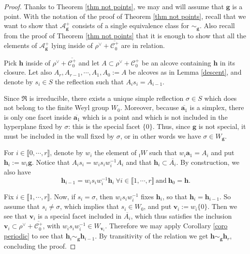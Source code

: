 \documentclass[11pt]{amsart}
\theoremstyle{plain}
\theoremstyle{remark}
\numberwithin{equation}{section}
\begin{document}
	\begin{proof}
		Thanks to Theorem \ref{thm not points}, we may and will assume that $\mathbf{g}$ is a point. With the notation of the proof of Theorem \ref{thm not points}, recall that we want to show that $\mathcal{A}^+_\mathbf{g}$ consists of a single equivalence class for $\sim_{\mathbf{g}}$. Also recall from the proof of Theorem \ref{thm not points} that it is enough to show that all the elements of $\mathcal{A}^+_\mathbf{g}$ lying inside of $\rho^\vee+ \overline{\mathscr{C}^+_0}$ are in relation.
		
		Pick $\mathbf{h}$ inside of $\rho^\vee+\overline{\mathscr{C}^+_0}$ and let $A\subset \rho^\vee+\mathscr{C}^+_0$ be an alcove containing $\mathbf{h}$ in its closure. Let also $A_r,A_{r-1},\cdots,A_1,A_0:=A$ be alcoves as in Lemma \ref{descent}, and denote by $s_i\in S$ the reflection such that $A_is_i=A_{i-1}$. 
		
		Since $\mathfrak{R}$ is irreducible, there exists a unique simple reflection $\sigma\in S$ which does not belong to the finite Weyl group $W_0$. Moreover, because $\overline{\mathbf{a}_1}$ is a simplex, there is only one facet inside $\overline{\mathbf{a}_1}$ which is a point and which is not included in the hyperplane fixed by $\sigma$: this is the special facet $\{0\}$. Thus, since $\mathbf{g}$ is not special, it must be included in the wall fixed by $\sigma$, or in other words we have $\sigma\in W_\mathbf{g}$. 
		
		For $i\in\llbracket 0,\cdots,r\rrbracket$, denote by $w_i$ the element of $_{\mathrm{f}}W$ such that $w_i\mathbf{a}_1=A_i$ and put $\mathbf{h}_i:=w_i\mathbf{g}$. Notice that $A_is_i=w_is_iw_i^{-1}A_i$ and that $\mathbf{h}_i\subset \overline{A_i}$. By construction, we also have
		$$\mathbf{h}_{i-1}=w_is_iw_i^{-1} \mathbf{h}_{i}~\forall i\in\llbracket 1,\cdots,r\rrbracket~\text{and}~\mathbf{h}_0=\mathbf{h}.$$
		
		Fix $i\in\llbracket 1,\cdots,r\rrbracket$. Now, if $s_i=\sigma$, then $w_is_iw_i^{-1}$ fixes $\mathbf{h}_{i}$, so that $\mathbf{h}_{i}=\mathbf{h}_{i-1}$. So assume that $s_i\neq \sigma$, which implies that $s_i\in W_0$, and put $\mathbf{v}_i:=w_i\{0\}$. Then we see that $\mathbf{v}_i$ is a special facet included in $\overline{A_i}$, which thus satisfies the inclusion $\mathbf{v}_i\subset\rho^\vee+\overline{\mathscr{C}^+_0}$, with $w_is_iw_i^{-1}\in W_{\mathbf{v}_i}$. Therefore we may apply Corollary \ref{coro periodic} to see that $\mathbf{h}_{i}\sim_\mathbf{g}\mathbf{h}_{i-1}$. By transitivity of the relation we get $\mathbf{h}\sim_{\mathbf{g}}\mathbf{h}_r$, concluding the proof.
	\end{proof}
\end{document}

